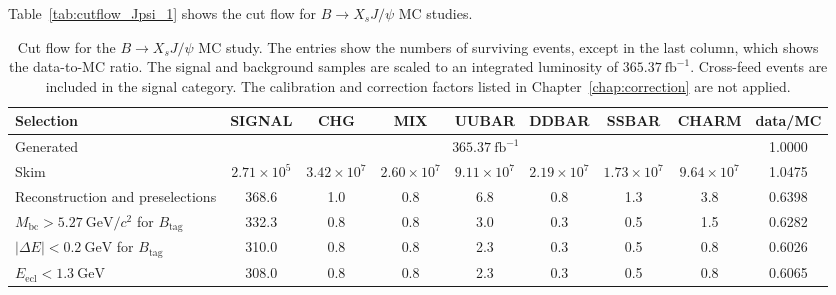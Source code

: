 Table~\ref{tab:cutflow_Jpsi_1} shows the cut flow for $B\rightarrow X_{s} J/\psi$ MC studies.
\begin{table}
\caption{
        Cut flow for the $B\rightarrow X_s J/\psi$ MC study.
        The entries show the numbers of surviving events, except in the
        last column, which shows the data-to-MC ratio.
        The signal and background samples are scaled to an integrated
        luminosity of $365.37~\textrm{fb}^{-1}$.
        Cross-feed events are included in the signal category.
        The calibration and correction factors listed in
        Chapter~\ref{chap:correction} are not applied.
    }
    \centering
    \renewcommand{\arraystretch}{1.2}
    \setlength{\tabcolsep}{5pt}

    \begin{adjustbox}{max width=0.98\textheight}
    \begin{tabular}{
        l ||
        c | c | c | c | c | c | c || c
    }
        \hline
        \hline

        Selection
        & SIGNAL
        & CHG
        & MIX
        & UUBAR
        & DDBAR
        & SSBAR
        & CHARM
        & data/MC \\
        \hline

        Generated
        & \multicolumn{7}{c||}{$365.37~\textrm{fb}^{-1}$}
        & 1.0000 \\

        Skim
        & $2.71\times10^{5}$
        & $3.42\times10^{7}$
        & $2.60\times10^{7}$
        & $9.11\times10^{7}$
        & $2.19\times10^{7}$
        & $1.73\times10^{7}$
        & $9.64\times10^{7}$
        & 1.0475 \\

        Reconstruction and preselections
        & 368.6
        & 1.0
        & 0.8
        & 6.8
        & 0.8
        & 1.3
        & 3.8
        & 0.6398 \\

        $M_{\textrm{bc}}>5.27~\textrm{GeV}/c^{2}$ for $B_{\textrm{tag}}$
        & 332.3
        & 0.8
        & 0.8
        & 3.0
        & 0.3
        & 0.5
        & 1.5
        & 0.6282 \\

        $\left|\Delta E\right|<0.2~\textrm{GeV}$ for $B_{\textrm{tag}}$
        & 310.0
        & 0.8
        & 0.8
        & 2.3
        & 0.3
        & 0.5
        & 0.8
        & 0.6026 \\

        $E_{\textrm{ecl}}<1.3~\textrm{GeV}$
        & 308.0
        & 0.8
        & 0.8
        & 2.3
        & 0.3
        & 0.5
        & 0.8
        & 0.6065 \\


\end{tabular}
\end{adjustbox}
\end{table}
